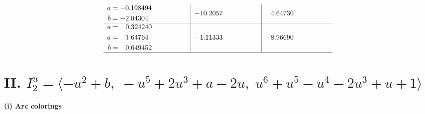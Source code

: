 \documentclass[1p]{elsarticle_modified}
\theoremstyle{definition}
\begin{document}
$$\begin{array}{c|c|c}
\begin{aligned}
a &= -0.198494\phantom{ +0.000000I} \\
b &= -2.04304\phantom{ +0.000000I}\end{aligned}
 & -10.2057\phantom{ +0.000000I} & \phantom{-}4.64730\phantom{ +0.000000I} \\ \hline\begin{aligned}
u &= \phantom{-}0.324240\phantom{ +0.000000I} \\
a &= \phantom{-}1.64764\phantom{ +0.000000I} \\
b &= \phantom{-}0.649452\phantom{ +0.000000I}\end{aligned}
 & -1.11333\phantom{ +0.000000I} & -8.96690\phantom{ +0.000000I}\\
 \hline 
 \end{array}$$\newpage\newpage\renewcommand{\arraystretch}{1}
\centering \section*{II. $I^u_{2}= \langle - u^2+b,\;- u^5+2 u^3+a-2 u,\;u^6+u^5- u^4-2 u^3+u+1 \rangle$}
\flushleft \textbf{(i) Arc colorings}\\
\end{document}
